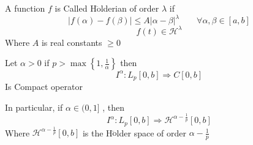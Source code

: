 \vmasafa\vmasafa
\begin{definition}
    A function $f$ is Called H$\ddot{\text{o}}$lderian of order $\lambda$ if 
    \[
    |f(\alpha)-f(\beta)| \leq A|\alpha-\beta|^\lambda \qquad \forall \alpha,\beta \in [a,b]
    \]
    \[
        f(t) \in \mathcal{H}^{\lambda}
    \]
    Where $A$ is real constants $\geq 0$
\end{definition}
\vmasafa
\begin{theorem}
    Let $\alpha > 0 $ if $p> \max\left\{1,\frac{1}{\alpha}\right\}$ then 
    \[
    I^{\alpha} : L_p[0,b] \Longrightarrow  C[0,b]
    \]
    Is Compact operator 

    In particular, if $\alpha \in (0, 1]$ , then 
    \[
        I^{\alpha} : L_p[0,b] \Longrightarrow \mathcal{H}^{\alpha-\frac{1}{p}} [0, b]
    \]
    Where $\mathcal{H}^{\alpha-\frac{1}{p}} [0, b]$ is the H$\ddot{\text{o}}$lder space of order
    ${\alpha-\frac{1}{p}}$ 
\end{theorem}
\newpage

